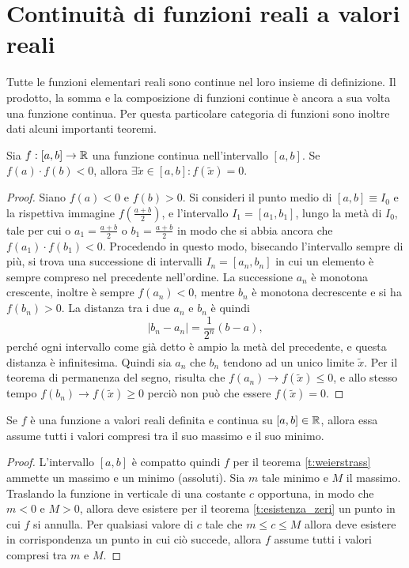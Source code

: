 \section{Continuità di funzioni reali a valori reali}
Tutte le funzioni elementari reali sono continue nel loro insieme di definizione. Il prodotto, la somma e la composizione di funzioni continue è ancora a sua volta una funzione continua. Per questa particolare categoria di funzioni sono inoltre dati alcuni importanti teoremi.
\begin{teorema} \label{t:esistenza_zeri}
Sia $f:[a,b]\to\mathbb{R}$ una funzione continua nell'intervallo $[a,b]$. Se $f(a)\cdot f(b)<0$, allora $\exists\tilde{x}\in[a,b]\colon f(\tilde{x})=0$.
\end{teorema}
\begin{proof}
Siano $f(a)<0$ e $f(b)>0$. Si consideri il punto medio di $[a,b]\equiv I_0$ e la rispettiva immagine $f(\frac{a+b}{2})$, e l'intervallo $I_1=[a_1,b_1]$, lungo la metà di $I_0$, tale per cui o $a_1=\frac{a+b}{2}$ o $b_1=\frac{a+b}{2}$ in modo che si abbia ancora che $f(a_1)\cdot f(b_1)<0$. Procedendo in questo modo, bisecando l'intervallo sempre di più, si trova una successione di intervalli $I_n=[a_n,b_n]$ in cui un elemento è sempre compreso nel precedente nell'ordine.
La successione $a_n$ è monotona crescente, inoltre è sempre $f(a_n)<0$, mentre $b_n$ è monotona decrescente e si ha $f(b_n)>0$. La distanza tra i due $a_n$ e $b_n$ è quindi
\[
|b_n-a_n|=\frac1{2^n}(b-a),
\]
perché ogni intervallo come già detto è ampio la metà del precedente, e questa distanza è infinitesima. Quindi sia $a_n$ che $b_n$ tendono ad un unico limite $\tilde{x}$. Per il teorema di permanenza del segno, risulta che $f(a_n)\to f(\tilde{x})\leq 0$, e allo stesso tempo $f(b_n)\to f(\tilde{x})\geq 0$ perciò non può che essere $f(\tilde{x})=0$.
\end{proof}
\begin{teorema}
\label{t:valori_intermedi}
Se $f$ è una funzione a valori reali definita e continua su $[a,b]\in\mathbb{R}$, allora essa assume tutti i valori compresi tra il suo massimo e il suo minimo.
\end{teorema}
\begin{proof}
L'intervallo $[a,b]$ è compatto quindi $f$ per il teorema \ref{t:weierstrass} ammette un massimo e un minimo (assoluti). Sia $m$ tale minimo e $M$ il massimo. Traslando la funzione in verticale di una costante $c$ opportuna, in modo che $m<0$ e $M>0$, allora deve esistere per il teorema \ref{t:esistenza_zeri} un punto in cui $f$ si annulla. Per qualsiasi valore di $c$ tale che $m\leq c\leq M$ allora deve esistere in corrispondenza un punto in cui ciò succede, allora $f$ assume tutti i valori compresi tra $m$ e $M$.
\end{proof}
